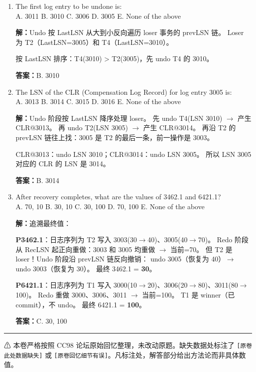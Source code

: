 \documentclass[11pt,a4paper]{article}
\newcommand{\solution}{\par\noindent\textcolor{ansblue}{\textbf{解：}}}
\newcommand{\answer}{\par\noindent\textcolor{ansred}{\textbf{答案：}}}
\begin{document}
\begin{enumerate}[leftmargin=*,itemsep=6pt]
  逐个检查 3000--3012：
  \begin{itemize}[nosep]
    \item 3000 (T1, P6421)：页在 DPT，RecLSN $\le$ 3000，PageLSN=3006 $\ge$ 3000？
          实际执行 Redo 时按 LSN 递增遍历日志。3000 到达时 P6421 的 PageLSN 尚为初始值（<3000），
          不跳过。执行 3000。
    \item 3003 (T2, P3462)：不跳过，执行。
    \item 3010 (T4, P5235)：不跳过，执行。
    \item 3011 (T1, P6421)：不跳过，执行。
  \end{itemize}
  所有 update log 均不跳过。

  \answer \textcolor{ansred}{E. None of the above}

\item The first log entry to be undone is:\\
  A. 3011 \quad B. 3010 \quad C. 3006 \quad D. 3005 \quad E. None of the above

  \solution Undo 按 LastLSN 从大到小反向遍历 loser 事务的 prevLSN 链。
  Loser 为 T2（LastLSN=3005）和 T4（LastLSN=3010）。

  按 LastLSN 排序：T4(3010) > T2(3005)，先 undo T4 的 3010。

  \answer \textcolor{ansred}{B. 3010}

\item The LSN of the CLR (Compensation Log Record) for log entry 3005 is:\\
  A. 3013 \quad B. 3014 \quad C. 3015 \quad D. 3016 \quad E. None of the above

  \solution Undo 阶段按 LastLSN 降序处理 loser。
  先 undo T4(LSN 3010) $\to$ 产生 CLR@3013。
  再 undo T2(LSN 3005) $\to$ 产生 CLR@3014。
  再沿 T2 的 prevLSN 链往上找：3005 是 T2 的最后一条，前一操作是 3003。

  CLR@3013：undo LSN 3010；CLR@3014：undo LSN 3005。
  所以 LSN 3005 对应的 CLR 的 LSN 是 3014。

  \answer \textcolor{ansred}{B. 3014}

\item After recovery completes, what are the values of 3462.1 and 6421.1?\\
  A. 70, 10 \quad B. 30, 10 \quad C. 30, 100 \quad D. 70, 100 \quad
  E. None of the above

  \solution 追溯最终值：

  \textbf{P3462.1}：日志序列为 T2 写入 3003(30$\to$40)、3005(40$\to$70)。
  Redo 阶段从 RecLSN 起正向重做：3003 和 3005 均重做 $\to$ 当前=70。
  但 T2 是 loser！Undo 阶段沿 prevLSN 链反向撤销：
  undo 3005（恢复为 40）$\to$ undo 3003（恢复为 30）。
  最终 3462.1 = \textbf{30}。

  \textbf{P6421.1}：日志序列为 T1 写入
  3000(10$\to$20)、3006(20$\to$80)、3011(80$\to$100)。
  Redo 重做 3000、3006、3011 $\to$ 当前=100。
  T1 是 winner（已 commit），不 undo。
  最终 6421.1 = \textbf{100}。

  \answer \textcolor{ansred}{C. 30, 100}

\end{enumerate}

\vfill
\hrule
\vspace{4pt}
{\footnotesize \textcolor{ansred}{⚠ 本卷严格按照 CC98 论坛原始回忆整理，未改动原题。缺失数据处标注了 \texttt{[原卷此处数据缺失]} 或 \texttt{[原卷回忆细节有误]}。凡标注处，解答部分给出方法论而非具体数值。}}
\end{document}
